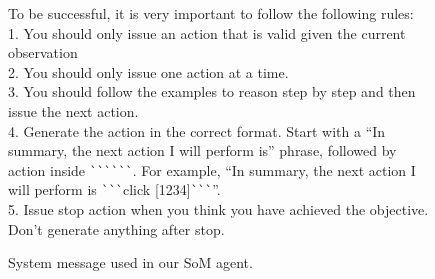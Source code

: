 \begin{figure}[th]
{{To be successful, it is very important to follow the following rules:\\
1. You should only issue an action that is valid given the current observation\\
2. You should only issue one action at a time.\\
3. You should follow the examples to reason step by step and then issue the next action.\\
4. Generate the action in the correct format. Start with a ``In summary, the next action I will perform is'' phrase, followed by action inside \texttt{\`}\texttt{\`}\texttt{\`}\texttt{\`}\texttt{\`}\texttt{\`}. For example, ``In summary, the next action I will perform is \texttt{\`}\texttt{\`}\texttt{\`}click [1234]\texttt{\`}\texttt{\`}\texttt{\`}''.\\
5. Issue stop action when you think you have achieved the objective. Don't generate anything after stop.
}
}
\caption{System message used in our SoM agent.}  \label{fig:system_message}
\end{figure}

